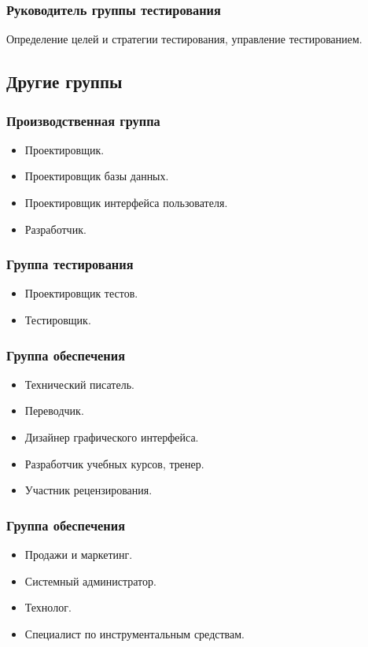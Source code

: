 \documentclass{../industrial-development}
\begin{document}
\begin{frame} \frametitle{Руководитель группы тестирования}
Определение целей и стратегии тестирования, управление тестированием.
\end{frame}

\subsection{Другие группы}

\begin{frame} \frametitle{Производственная группа}
  \begin{itemize}
    \item Проектировщик. 
    \item Проектировщик базы данных.
    \item Проектировщик интерфейса пользователя.
    \item Разработчик.
  \end{itemize}
\end{frame}

\begin{frame} \frametitle{Группа тестирования}
  \begin{itemize}
    \item Проектировщик тестов.
    \item Тестировщик.
  \end{itemize}  
\end{frame}

\begin{frame} \frametitle{Группа обеспечения}
  \begin{itemize}
  \item Технический писатель.
  \item Переводчик.
  \item Дизайнер графического интерфейса.
  \item Разработчик учебных курсов, тренер.
  \item Участник рецензирования.
  \end{itemize}  
\end{frame}

\begin{frame} \frametitle{Группа обеспечения}
\begin{itemize}
  \item Продажи и маркетинг.
  \item Системный администратор.
  \item Технолог.
  \item Специалист по инструментальным средствам.
  \end{itemize}  
\end{frame}
\end{document}

